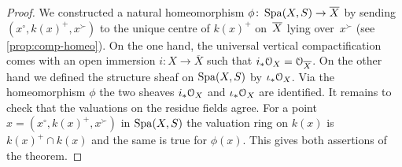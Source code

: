 \begin{proof}
    We constructed a natural homeomorphism $\phi \colon \operatorname{Spa}(X,S) \to \overline{X}$ by sending $(x^\circ,k(x)^+,x^\succ)$ to the unique centre of $k(x)^+$ on~$\overline{X}$ lying over~$x^\succ$ (see \cref{prop:comp-homeo}).
    On the one hand, the universal vertical compactification comes with an open immersion $i \colon X \to \overline{X}$ such that $i_*{\mathcal O}_X = {\mathcal O}_{\overline{X}}$.
    On the other hand we defined the structure sheaf on $\operatorname{Spa}(X,S)$ by $\iota_*{\mathcal O}_X$.
    Via the homeomorphism $\phi$ the two sheaves $i_*{\mathcal O}_X$ and $\iota_*{\mathcal O}_X$ are identified.
    It remains to check that the valuations on the residue fields agree.
    For a point $x = (x^\circ,k(x)^+,x^\succ)$ in $\operatorname{Spa}(X,S)$ the valuation ring on $k(x)$ is $k(x)^+ \cap k(x)$ and the same is true for $\phi(x)$.
    This gives both assertions of the theorem.
\end{proof}

